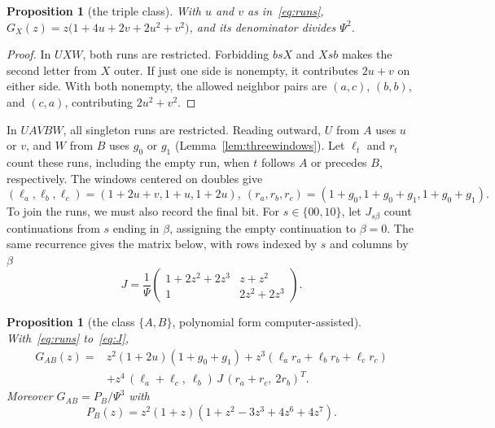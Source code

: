 \documentclass[12pt]{article}
\theoremstyle{plain}
\newtheorem{proposition}[theorem]{Proposition}
\theoremstyle{definition}
\theoremstyle{remark}
\begin{document}
\begin{proposition}[the triple class]\label{prop:GX}
With $u$ and $v$ as in~\eqref{eq:runs}, $G_X(z)=z\bigl(1+4u+2v+2u^2+v^2\bigr)$, and its
denominator divides $\Psi^2$.
\end{proposition}

\begin{proof}
In $UXW$, both runs are restricted. Forbidding $bsX$ and $Xsb$
makes the second letter from $X$ outer. If just one side is nonempty, it contributes
$2u+v$ on either side. With both nonempty, the allowed neighbor pairs are
$(a,c)$, $(b,b)$, and $(c,a)$, contributing $2u^2+v^2$.
\end{proof}

In $UAVBW$, all singleton runs are restricted. Reading outward,
$U$ from $A$ uses $u$ or $v$, and $W$ from $B$ uses $g_0$ or $g_1$
(Lemma~\ref{lem:threewindows}). Let $\ell_t$ and $r_t$ count these runs, including the empty run,
when $t$ follows $A$ or precedes $B$, respectively. The windows centered on doubles give
\begin{equation}\label{eq:lr}
(\ell_a,\ell_b,\ell_c)=(1+2u+v,1+u,1+2u),\ (r_a,r_b,r_c)=(1+g_0,1+g_0+g_1,1+g_0+g_1).
\end{equation}
To join the runs, we must also record the final bit. For $s\in\{00,10\}$, let $J_{s\beta}$
count continuations from $s$ ending in $\beta$, assigning the empty
continuation to $\beta=0$. The same recurrence gives the matrix below,
with rows indexed by $s$ and columns by $\beta$
\begin{equation}\label{eq:J}
J=\frac1\Psi\begin{pmatrix}1+2z^2+2z^3&z+z^2\\1&2z^2+2z^3\end{pmatrix}.
\end{equation}

\begin{proposition}[the class $\{A,B\}$, polynomial form computer-assisted]\label{prop:GAB}
With~\eqref{eq:runs} to~\eqref{eq:J},
\begin{equation}\label{eq:GAB}
\begin{aligned}
G_{AB}(z)={}&z^2(1+2u)(1+g_0+g_1)+z^3(\ell_ar_a+\ell_br_b+\ell_cr_c)\\
&+z^4\,(\ell_a+\ell_c,\ \ell_b)\,J\,(r_a+r_c,\ 2r_b)^{T}.
\end{aligned}
\end{equation}
Moreover $G_{AB}=P_B/\Psi^3$ with
\begin{equation}\label{eq:PB}
P_B(z)=z^2(1+z)(1+z^2-3z^3+4z^6+4z^7).
\end{equation}
\end{proposition}
\end{document}
